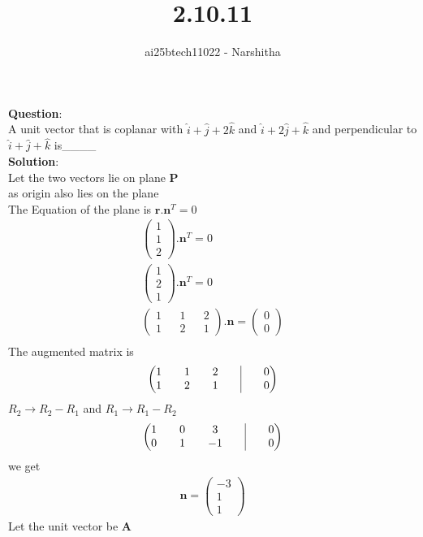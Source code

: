 \documentclass{beamer}
\title{2.10.11}
\author{ai25btech11022 - Narshitha}
\theoremstyle{remark}
\newcommand{\myvec}[1]{\ensuremath{\begin{pmatrix}#1\end{pmatrix}}}
\let\vec\mathbf
\numberwithin{equation}{section}
\begin{document}
{\let\newpage\relax\maketitle}
\renewcommand{\thefigure}{\theenumi}
\renewcommand{\thetable}{\theenumi} 
\textbf{Question}:\\
A unit vector that is coplanar with $\hat{i}+\hat{j}+2\hat{k}$ and $\hat{i}+2\hat{j}+\hat{k}$ and perpendicular to $\hat{i}+\hat{j}+\hat{k}$ is\_\_\_\_\\
\textbf{Solution}:\\
Let the two vectors lie on plane $\vec{P}$\\
as origin also lies on the plane\\
The Equation of the plane is $\vec{r}.{\vec{n}^T}=0$
\begin{align}
    \myvec{1\\1\\2}.{\vec{n}}^T=0\\
    \myvec{1\\2\\1}.{\vec{n}}^T=0\\
    \myvec{1 && 1 && 2\\1 && 2 &&1}.\vec{n}=\myvec{0\\0}\\
\end{align}
The augmented  matrix is
\begin{align}
    \myvec{1 && 1 && 2 &&\vrule&& 0\\1 && 2 && 1 &&\vrule&& 0}\\
\end{align}  
$R_2\rightarrow R_2-R_1$ and $R_1\rightarrow R_1-R_2$\\
\begin{align}
    \myvec{1 && 0 && 3 && \vrule&& 0\\0 && 1 && -1 &&\vrule&& 0}
\end{align}
we get\\
\begin{align}
    \vec{n}=\myvec{-3\\1\\1}
\end{align}
Let the unit vector be $\vec{A}$\\
\end{document}
